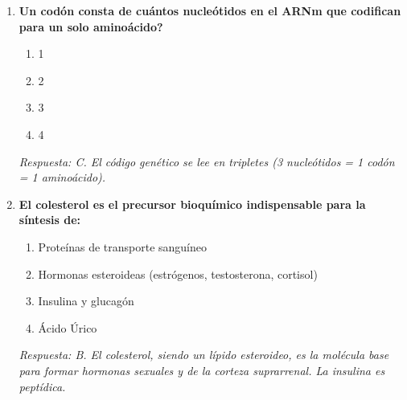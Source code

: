 \documentclass[spanish,letterpaper,oneside]{article}
\begin{document}
\begin{enumerate}[label=\textbf{\arabic*.}]
    \item \textbf{Un codón consta de cuántos nucleótidos en el ARNm que codifican para un solo aminoácido?}
    \begin{enumerate}
        \item[A)] 1
        \item[B)] 2
        \item[C)] 3
        \item[D)] 4
    \end{enumerate}
    \textit{Respuesta: C. El código genético se lee en tripletes (3 nucleótidos = 1 codón = 1 aminoácido).}

    \item \textbf{El colesterol es el precursor bioquímico indispensable para la síntesis de:}
    \begin{enumerate}
        \item[A)] Proteínas de transporte sanguíneo
        \item[B)] Hormonas esteroideas (estrógenos, testosterona, cortisol)
        \item[C)] Insulina y glucagón
        \item[D)] Ácido Úrico
    \end{enumerate}
    \textit{Respuesta: B. El colesterol, siendo un lípido esteroideo, es la molécula base para formar hormonas sexuales y de la corteza suprarrenal. La insulina es peptídica.}

\end{enumerate}
\end{document}
